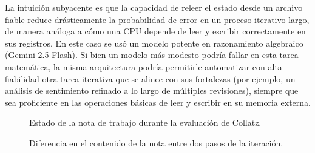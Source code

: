 La intuición subyacente es que la capacidad de releer el estado desde un archivo fiable reduce drásticamente la probabilidad de error en un proceso iterativo largo, de manera análoga a cómo una CPU depende de leer y escribir correctamente en sus registros. En este caso se usó un modelo potente en razonamiento algebraico (Gemini 2.5 Flash). Si bien un modelo más modesto podría fallar en esta tarea matemática, la misma arquitectura podría permitirle automatizar con alta fiabilidad otra tarea iterativa que se alinee con sus fortalezas (por ejemplo, un análisis de sentimiento refinado a lo largo de múltiples revisiones), siempre que sea proficiente en las operaciones básicas de leer y escribir en su memoria externa.

\begin{figure}[h]
    \centering
    \caption{Estado de la nota de trabajo durante la evaluación de Collatz.}
    \label{fig:collatz_code}
\end{figure}
\begin{figure}[h]
    \centering
    \caption{Diferencia en el contenido de la nota entre dos pasos de la iteración.}
    \label{fig:collatz_diff}
\end{figure}


